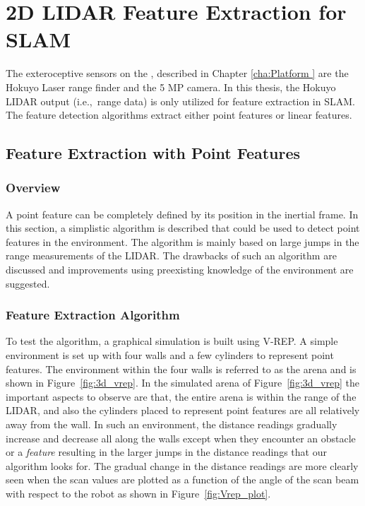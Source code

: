 \chapter{2D LIDAR Feature Extraction for SLAM}
\label{cha:featureExtractor}

The exteroceptive sensors on the \imp, described in Chapter \ref{cha:Platform } are the Hokuyo Laser range finder and the 5 MP camera. In this thesis, the Hokuyo LIDAR output (i.e.,\ range data) is only utilized for feature extraction in SLAM. The feature detection algorithms extract either point features or linear features. 

\section{Feature Extraction with Point Features}
\label{sec:spike}
\subsection{Overview}
A point feature can be completely defined by its position in the inertial frame. In this section, a simplistic algorithm is described that could be used to detect point features in the environment. The algorithm is mainly based on large jumps in the range measurements of the LIDAR. The drawbacks of such an algorithm are discussed and improvements using preexisting knowledge of the environment are suggested.

\subsection{Feature Extraction Algorithm}
\label{sec: spikeAlgo}

To test the algorithm, a graphical simulation is built using V-REP\cite{vrep}. A simple environment is set up with four walls and a few cylinders to represent point features. The environment within the four walls is referred to as the arena and is shown in Figure~\ref{fig:3d_vrep}. In the simulated arena of Figure~\ref{fig:3d_vrep} the important aspects to observe are that, the entire arena is within the range of the LIDAR, and also the cylinders placed to represent point features are all relatively away from the wall. In such an environment, the distance readings gradually increase and decrease all along the walls except when they encounter an obstacle or a \textit{feature} resulting in the larger jumps in the distance readings that our algorithm looks for. The gradual change in the distance readings are more clearly seen when the scan values are plotted as a function of the angle of the scan beam with respect to the robot as shown in Figure~\ref{fig:Vrep_plot}.

